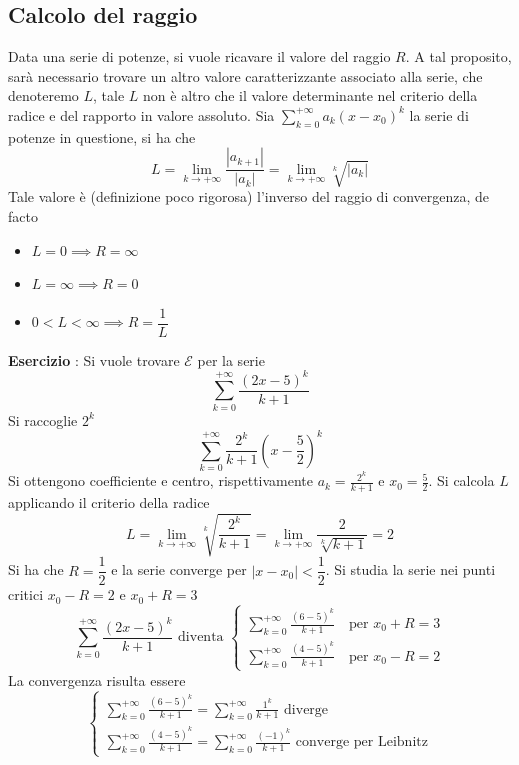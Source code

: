 \documentclass[10pt, letterpaper]{report}
\begin{document}
\subsection{Calcolo del raggio}
Data una serie di potenze, si vuole ricavare il valore del raggio $R$. A tal proposito, sarà necessario
trovare un altro valore caratterizzante associato alla serie, che denoteremo $L$, tale $L$ non è altro
che il valore determinante nel criterio della radice e del rapporto in valore assoluto. Sia
$\displaystyle \sum_{k=0}^{+\infty}a_k(x-x_0)^k $ la serie di potenze in questione, si ha che
$$ L = \displaystyle \lim_{k\rightarrow+\infty}\frac{|a_{k+1}|}{|a_k|}
    = \lim_{k\rightarrow+\infty}\sqrt[k]{|a_k|}$$
Tale valore è (definizione poco rigorosa) l'inverso del raggio di convergenza, de facto\begin{itemize}
    \item $L=0\implies R=\infty$
    \item $L=\infty\implies R=0$
    \item $0<L<\infty\implies R = \dfrac{1}{L}$
\end{itemize}
\textbf{Esercizio} : Si vuole trovare $\mathcal{E}$ per la serie
$$ \displaystyle \sum_{k=0}^{+\infty}\frac{(2x-5)^k}{k+1}$$
Si raccoglie $2^k$
$$ \displaystyle \sum_{k=0}^{+\infty}\frac{2^k}{k+1}(x-\frac{5}{2})^k $$
Si ottengono coefficiente e centro, rispettivamente $a_k=\frac{2^k}{k+1}$ e $x_0 = \frac{5}{2}$. Si
calcola $L$ applicando il criterio della radice
$$ L =\displaystyle \lim_{k\rightarrow+\infty}\sqrt[k]{\frac{2^k}{k+1}}
    = \lim_{k\rightarrow+\infty}\frac{2}{\sqrt[k]{k+1}}=2$$
Si ha che $R=\dfrac{1}{2}$ e la serie converge per $|x-x_0|<\dfrac{1}{2}$. Si studia la serie
nei punti critici  $x_0-R=2$  e  $x_0+R=3$
$$
    \displaystyle \sum_{k=0}^{+\infty}\frac{(2x-5)^k}{k+1}\text{ diventa }  \begin{cases}
        \displaystyle \sum_{k=0}^{+\infty}\frac{(6-5)^k}{k+1} \text{  }\text{ per }x_0+R=3 \\
        \displaystyle \sum_{k=0}^{+\infty}\frac{(4-5)^k}{k+1}\text{  }\text{ per }x_0-R=2
    \end{cases}
$$
La convergenza risulta essere
$$
    \begin{cases}
        \displaystyle \sum_{k=0}^{+\infty}\frac{(6-5)^k}{k+1} =\displaystyle \sum_{k=0}^{+\infty}\frac{1^k}{k+1}\text{ diverge} \\
        \displaystyle \sum_{k=0}^{+\infty}\frac{(4-5)^k}{k+1}=\displaystyle \sum_{k=0}^{+\infty}\frac{(-1)^k}{k+1}\text{ converge per Leibnitz}
    \end{cases}
$$
\end{document}
